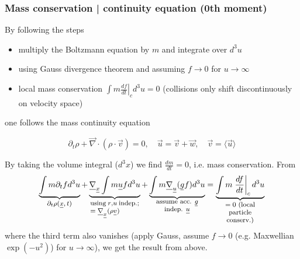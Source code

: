 \subsubsection{Mass conservation | continuity equation (0th moment)}
By following the steps
\begin{itemize}
    \item multiply the Boltzmann equation by $m$ and integrate over $d^3u$
    \item using Gauss divergence theorem and assuming $f \rightarrow 0$ for $u \rightarrow \infty$
    \item local mass conservation $\int m \left. \frac{df}{dt} \right|_c d^3u = 0$ (collisions only shift discontinuously on velocity space)
\end{itemize}
one follows the mass continuity equation
\begin{mdframed}[style = padded]
\begin{equation}
    \partial_t\rho + \vec{\nabla} \cdot (\rho \cdot \vec{v}) = 0, \quad \vec{u} = \vec{v} + \vec{w}, \quad \vec{v} = \langle \vec{u} \rangle
\end{equation}
\end{mdframed}
By taking the volume integral ($d^3x$) we find $\frac{dm}{dt} = 0$, i.e. mass conservation.
From
\begin{equation}
    \explain{\int m \partial_t f d^3u}{$\partial_t\rho(\vec{x},t)$} + \underbrace{\vec{\nabla}_\vec{x} \int m \vec{u} f d^3u}_{\parbox{6em}{\footnotesize using $r$,$u$ indep.; $=\vec{\nabla}_\vec{x} (\rho \vec{v})$}} + \explain{\int m \vec{\nabla}_\vec{u} (\vec{g} f) d^3 u}{assume acc. $\vec{g}$ indep. $\vec{u}$} = \explain{\int m \left. \frac{df}{dt} \right|_c d^3u}{$=0$ (local particle conserv.)}
\end{equation}
where the third term also vanishes (apply Gauss, assume $f \rightarrow 0$ (e.g. Maxwellian $\exp(-u^2)$) for $u \rightarrow \infty$), we get the result from above.

